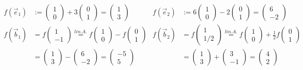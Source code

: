 \documentclass[titlepage]{article}
\newcommand{\1}{\mathbb{1}}
\newcommand{\0}{\mathbb{0}}
\begin{document}
		\begin{align*}
			f\left(\vec{e}_1\right)&:=\begin{pmatrix}1\\0\end{pmatrix}+3\begin{pmatrix}0\\1\end{pmatrix}=\begin{pmatrix}1\\3\end{pmatrix}& f(\vec{e}_2)&:=6\begin{pmatrix}1\\0\end{pmatrix}-2\begin{pmatrix}0\\1\end{pmatrix}=\begin{pmatrix}6\\-2\end{pmatrix}
			\\
			f\left(\vec{b}_1\right)&=f\begin{pmatrix}1\\-1\end{pmatrix}\overset{lin.A.}{=}f\begin{pmatrix}1\\0\end{pmatrix}-f\begin{pmatrix}0\\1\end{pmatrix}& f(\vec{b}_2)&=f\begin{pmatrix}1\\1/2\end{pmatrix}\overset{lin.A.}{=}f\begin{pmatrix}1\\0\end{pmatrix}+\frac{1}{2}f\begin{pmatrix}0\\1\end{pmatrix}\\
			&=\begin{pmatrix}1\\3\end{pmatrix}-\begin{pmatrix}6\\-2\end{pmatrix}=\begin{pmatrix}-5\\5\end{pmatrix}&&=\begin{pmatrix}1\\3\end{pmatrix}+\begin{pmatrix}3\\-1\end{pmatrix}=\begin{pmatrix}4\\2\end{pmatrix}
		\end{align*}
\end{document}
